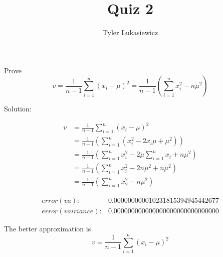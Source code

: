 \documentclass{article}
\title{Quiz 2}
\author{Tyler Lukasiewicz}
\begin{document}
\maketitle

Prove 
\begin{equation}
    v = \frac{1}{n-1} \sum_{i =1}^n (x_i - \mu)^2 = \frac{1}{n-1} (\sum_{i = 1}^n x_i ^2 -n \mu ^2)
\end{equation}

Solution:

\begin{align*}
    v &= \frac{1}{n-1} \sum_{i =1}^n (x_i - \mu)^2 \\
    &= \frac{1}{n-1}(\sum_{i=1}^n (x_i^2 - 2 x_i \mu  + \mu ^2)) \\
    &= \frac{1}{n-1} (\sum_{i=1}^n x_i^2 - 2 \mu \sum_{i=1}^n x_i + n \mu^2) \\
    &=  \frac{1}{n-1} (\sum_{i=1}^n x_i^2  - 2 n \mu ^2 + n \mu ^2) \\
    &= \frac{1}{n-1}(\sum_{i=1}^n x_2^2 - n \mu ^2)
\end{align*}

\begin{align*}
    error(va): &0.000000000010231815394945442677 \\
    error(vairiance): &0.000000000000000000000000000000
\end{align*}


The better approximation is
\begin{equation*}
     v = \frac{1}{n-1} \sum_{i =1}^n (x_i - \mu)^2 
\end{equation*}
\end{document}
